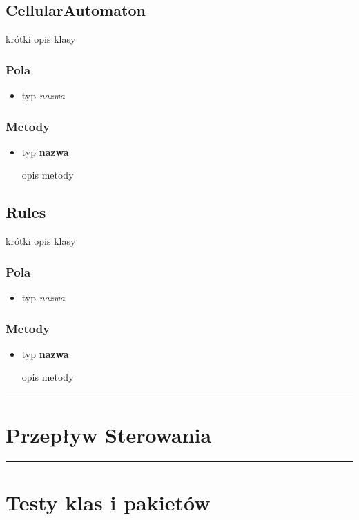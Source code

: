\documentclass[a4paper,11pt]{article}
\newcommand{\linia}{\rule{\linewidth}{0.4mm}}
\begin{document}
\subsection{CellularAutomaton}
krótki opis klasy
\subsubsection{Pola}
\begin{itemize}
\item typ  \textit{nazwa}
\end{itemize}
\subsubsection{Metody}
\begin{itemize}
\item typ  \textbf{nazwa}

opis metody
\end{itemize}




\subsection{Rules}
krótki opis klasy
\subsubsection{Pola}
\begin{itemize}
\item typ  \textit{nazwa}
\end{itemize}
\subsubsection{Metody}
\begin{itemize}
\item typ  \textbf{nazwa}

opis metody
\end{itemize}


\noindent\linia
\section{Przepływ Sterowania}




\noindent\linia
\section{Testy klas i pakietów}
\end{document}
